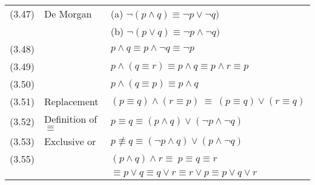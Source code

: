 \documentclass[letterpaper, 8pt]{extarticle}
\begin{document}
\begin{multicols*}{3}
\begin{tabulary}{\linewidth}{@{}lLL@{}}
        (3.47) & De Morgan                              & (a) $\neg (p \land q) \equiv \neg p \lor \neg q)$                              \\
        &                                        & (b) $\neg (p \lor q) \equiv \neg p \land \neg q)$                              \\
        (3.48) &                                        & $p \land q \equiv p \land \neg q \equiv \neg p$                                \\
        (3.49) &                                        & $p \land (q \equiv r) \equiv p \land q \equiv p \land r \equiv p$              \\
        (3.50) &                                        & $p \land (q \equiv p) \equiv p \land q$                                        \\
        (3.51) & Replacement                            & $(p \equiv q) \land (r \equiv p) \ \equiv \ (p \equiv q) \lor (r \equiv q)$    \\
        (3.52) & Definition of $\equiv$                 & $p \equiv q \equiv (p \land q) \lor (\neg p \land \neg q)$                     \\
        (3.53) & Exclusive or                           & $p \not\equiv q \equiv (\neg p \land q) \lor (p \land \neg q)$                 \\
        (3.55) &                                        & $(p \land q) \land r \equiv \ p \equiv q \equiv r$                             \\
        &                                        & \quad $\equiv p \lor q \equiv q \lor r \equiv r \lor p \equiv p \lor q \lor r$ \\
    \end{tabulary}


\end{multicols*}
\end{document}
